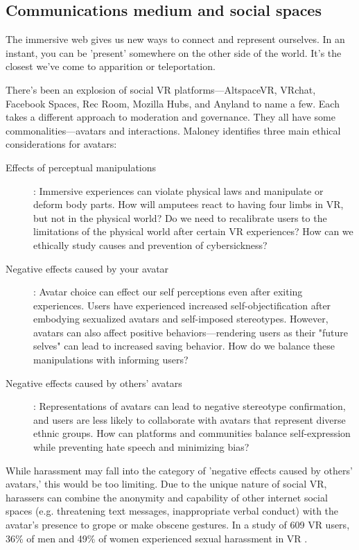 \subsection{Communications medium and social spaces} \label{subsec:communications}
The immersive web gives us new ways to connect and represent ourselves. In an instant, you can be 'present' somewhere on the other side of the world. It's the closest we've come to apparition or teleportation.

There's been an explosion of social VR platforms---AltspaceVR, VRchat, Facebook Spaces, Rec Room, Mozilla Hubs, and Anyland to name a few. Each takes a different approach to moderation and governance. They all have some commonalities---avatars and interactions. Maloney identifies three main ethical considerations for avatars\cite{maloney}:
\begin{description}
	\item[ Effects of perceptual manipulations]: Immersive experiences can violate physical laws and manipulate or deform body parts. How will amputees react to having four limbs in VR, but not in the physical world? Do we need to recalibrate users to the limitations of the physical world after certain VR experiences? How can we ethically study causes and prevention of cybersickness?
	\item [Negative effects caused by your avatar]: Avatar choice can effect our self perceptions even after exiting experiences. Users have experienced increased self-objectification after embodying sexualized avatars and self-imposed stereotypes. However, avatars can also affect positive behaviors---rendering users as their "future selves" can lead to increased saving behavior. How do we balance these manipulations with informing users?
	\item [Negative effects caused by others' avatars]: Representations of avatars can lead to negative stereotype confirmation, and users are less likely to collaborate with avatars that represent diverse ethnic groups. How can platforms and communities balance self-expression while preventing hate speech and minimizing bias?
\end{description}

While harassment may fall into the category of 'negative effects caused by others' avatars,' this would be too limiting. Due to the unique nature of social VR, harassers can combine the anonymity and capability of other internet social spaces (e.g. threatening text messages, inappropriate verbal conduct) with the avatar's presence to grope or make obscene gestures. In a study of 609 VR users, 36\% of men and 49\% of women experienced sexual harassment in VR \cite{outlaw2018}.

